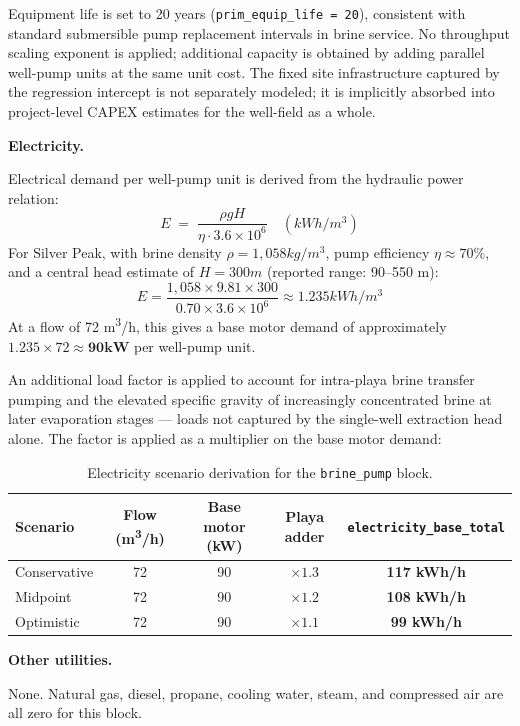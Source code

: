 \noindent Equipment life is set to 20 years (\texttt{prim\_equip\_life = 20}), consistent with standard submersible pump replacement intervals in brine service. No throughput scaling exponent is applied; additional capacity is obtained by adding parallel well-pump units at the same unit cost. The fixed site infrastructure captured by the regression intercept is not separately modeled; it is implicitly absorbed into project-level CAPEX estimates for the well-field as a whole.

\medskip
\noindent\textbf{Electricity.}\quad

Electrical demand per well-pump unit is derived from the hydraulic power relation:
\[
  E \;=\; \frac{\rho g H}{\eta \cdot 3.6 \times 10^6} \quad (\si{kWh/m^3})
\]
For Silver Peak, with brine density $\rho = 1,058 \si{kg/m^3}$, pump efficiency $\eta \approx 70\%$, and a central head estimate of $H = 300 \si{m}$ (reported range: 90--550 m):
\[
  E = \frac{1,058 \times 9.81 \times 300}{0.70 \times 3.6 \times 10^6} \approx 1.235 \si{kWh/m^3}
\]
At a flow of 72 \si{m^3/h}, this gives a base motor demand of approximately $1.235 \times 72 \approx \mathbf{90 \si{kW}}$ per well-pump unit.

An additional load factor is applied to account for intra-playa brine transfer pumping and the elevated specific gravity of increasingly concentrated brine at later evaporation stages --- loads not captured by the single-well extraction head alone. The factor is applied as a multiplier on the base motor demand:

\begin{table}[h!]
\caption{Electricity scenario derivation for the \texttt{brine\_pump} block.}
\centering
\begin{tabular}{lcccc}
\toprule
\textbf{Scenario} & \textbf{Flow (\si{m^3/h})} & \textbf{Base motor (kW)} & \textbf{Playa adder} & \texttt{electricity\_base\_total} \\
\midrule
Conservative & 72 & 90 & $\times 1.3$ & \textbf{117 kWh/h} \\
Midpoint     & 72 & 90 & $\times 1.2$ & \textbf{108 kWh/h} \\
Optimistic   & 72 & 90 & $\times 1.1$ & \textbf{99 kWh/h}  \\
\bottomrule
\end{tabular}
\end{table}

\medskip
\noindent\textbf{Other utilities.}\quad

None. Natural gas, diesel, propane, cooling water, steam, and compressed air are all zero for this block.

